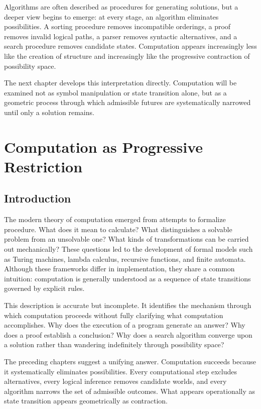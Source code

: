 \documentclass[11pt,oneside]{book}
\theoremstyle{plain}
\theoremstyle{definition}
\theoremstyle{remark}
\begin{document}
Algorithms are often described as procedures for generating solutions, but a deeper view begins to emerge: at every stage, an algorithm eliminates possibilities. A sorting procedure removes incompatible orderings, a proof removes invalid logical paths, a parser removes syntactic alternatives, and a search procedure removes candidate states. Computation appears increasingly less like the creation of structure and increasingly like the progressive contraction of possibility space.

The next chapter develops this interpretation directly. Computation will be examined not as symbol manipulation or state transition alone, but as a geometric process through which admissible futures are systematically narrowed until only a solution remains.

\chapter{Computation as Progressive Restriction}

\section{Introduction}

The modern theory of computation emerged from attempts to formalize procedure. What does it mean to calculate? What distinguishes a solvable problem from an unsolvable one? What kinds of transformations can be carried out mechanically? These questions led to the development of formal models such as Turing machines, lambda calculus, recursive functions, and finite automata. Although these frameworks differ in implementation, they share a common intuition: computation is generally understood as a sequence of state transitions governed by explicit rules.

This description is accurate but incomplete. It identifies the mechanism through which computation proceeds without fully clarifying what computation accomplishes. Why does the execution of a program generate an answer? Why does a proof establish a conclusion? Why does a search algorithm converge upon a solution rather than wandering indefinitely through possibility space?

The preceding chapters suggest a unifying answer. Computation succeeds because it systematically eliminates possibilities. Every computational step excludes alternatives, every logical inference removes candidate worlds, and every algorithm narrows the set of admissible outcomes. What appears operationally as state transition appears geometrically as contraction.
\end{document}
